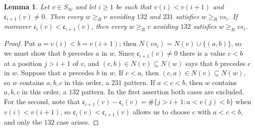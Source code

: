 \documentclass{amsart}
\newtheorem{lemma}{Lemma}[section]
\theoremstyle{definition}
\theoremstyle{remark}
\numberwithin{equation}{section}
\newcommand{\code}{\mathfrak{c}}
\begin{document}
\begin{lemma} \label{lemma:forcedmove}
Let $v\in S_\infty$ and let $i\geq1$ be such that $v(i)<v(i+1)$ and $\code_{i+1}(v)\neq0$. Then every $w\geq_Rv$ avoiding $132$ and $231$ satisfies $w\geq_Rvs_i$. If moreover $\code_i(v)<\code_{i+1}(v)$, then every $w\geq_Rv$ avoiding $132$ satisfies $w\geq_Rvs_i$.
\end{lemma}
\begin{proof}
Put $a=v(i)<b=v(i+1)$; then $N(vs_i)=N(v)\cup\{(a,b)\}$, so we must show that $b$ precedes $a$ in $w$. Since $\code_{i+1}(v)\neq0$ there is a value $c<b$ at a position $j>i+1$ of $v$, and $(c,b)\in N(v)\subseteq N(w)$ says that $b$ precedes $c$ in $w$. Suppose that $a$ precedes $b$ in $w$. If $c<a$, then $(c,a)\in N(v)\subseteq N(w)$, so $w$ contains $a,b,c$ in this order, a $231$ pattern. If $a<c<b$, then $w$ contains $a,b,c$ in this order, a $132$ pattern. In the first assertion both cases are excluded. For the second, note that $\code_{i+1}(v)-\code_i(v)=\#\{j>i+1:a<v(j)<b\}$ when $v(i)<v(i+1)$, so $\code_i(v)<\code_{i+1}(v)$ allows us to choose $c$ with $a<c<b$, and only the $132$ case arises.
\end{proof}
\end{document}
